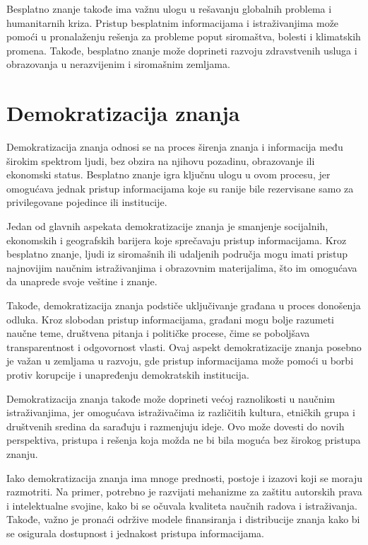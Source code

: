 \documentclass[a4paper]{article}
\begin{document}
{Besplatno znanje takođe ima važnu ulogu u rešavanju globalnih problema i humanitarnih kriza. Pristup besplatnim informacijama i istraživanjima može pomoći u pronalaženju rešenja za probleme poput siromaštva, bolesti i klimatskih promena. Takođe, besplatno znanje može doprineti razvoju zdravstvenih usluga i obrazovanja u nerazvijenim i siromašnim zemljama.


\setlength{\parskip}{1em}

\section{Demokratizacija znanja}
\label{Demokratizacija znanja}

Demokratizacija znanja odnosi se na proces širenja znanja i informacija među širokim spektrom ljudi, bez obzira na njihovu pozadinu, obrazovanje ili ekonomski status. Besplatno znanje igra ključnu ulogu u ovom procesu, jer omogućava jednak pristup informacijama koje su ranije bile rezervisane samo za privilegovane pojedince ili institucije.

Jedan od glavnih aspekata demokratizacije znanja je smanjenje socijalnih, ekonomskih i geografskih barijera koje sprečavaju pristup informacijama. Kroz besplatno znanje, ljudi iz siromašnih ili udaljenih područja mogu imati pristup najnovijim naučnim istraživanjima i obrazovnim materijalima, što im omogućava da unaprede svoje veštine i znanje.

Takođe, demokratizacija znanja podstiče uključivanje građana u proces donošenja odluka. Kroz slobodan pristup informacijama, građani mogu bolje razumeti naučne teme, društvena pitanja i političke procese, čime se poboljšava transparentnost i odgovornost vlasti. Ovaj aspekt demokratizacije znanja posebno je važan u zemljama u razvoju, gde pristup informacijama može pomoći u borbi protiv korupcije i unapređenju demokratskih institucija.

Demokratizacija znanja takođe može doprineti većoj raznolikosti u naučnim istraživanjima, jer omogućava istraživačima iz različitih kultura, etničkih grupa i društvenih sredina da sarađuju i razmenjuju ideje. Ovo može dovesti do novih perspektiva, pristupa i rešenja koja možda ne bi bila moguća bez širokog pristupa znanju.

Iako demokratizacija znanja ima mnoge prednosti, postoje i izazovi koji se moraju razmotriti. Na primer, potrebno je razvijati mehanizme za zaštitu autorskih prava i intelektualne svojine, kako bi se očuvala kvaliteta naučnih radova i istraživanja. Takođe, važno je pronaći održive modele finansiranja i distribucije znanja kako bi se osigurala dostupnost i jednakost pristupa informacijama.


}
\end{document}
